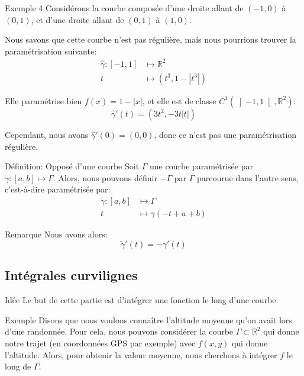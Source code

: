 \documentclass[a4paper]{article}
\begin{document}
\begin{parag}{Exemple 4}
    Considérons la courbe composée d'une droite allant de $\left(-1, 0\right)$ à $\left(0, 1\right)$, et d'une droite allant de $\left(0, 1\right)$ à $\left(1, 0\right)$. 

    Nous savons que cette courbe n'est pas régulière, mais nous pourrions trouver la paramétrisation suivante: 
    \[\begin{split}
        \hat{\gamma}: \left[-1, 1\right] &\longmapsto \mathbb{R}^2 \\
    t &\longmapsto \left(t^3, 1 - \left|t^3\right|\right)
    \end{split}\]
    
    Elle paramétrise bien $f\left(x\right) = 1 - \left|x\right|$, et elle est de classe $C^1\left(\left]-1, 1\right[ , \mathbb{R}^2\right)$: 
    \[\hat{\gamma}'\left(t\right) = \left(3t^2, -3t\left|t\right|\right)\]
    
    Cependant, nous avons $\hat{\gamma}'\left(0\right) = \left(0, 0\right)$, donc ce n'est pas une paramétrisation régulière.
\end{parag}

\begin{parag}{Définition: Opposé d'une courbe}
    Soit $\Gamma$ une courbe paramétrisée par $\gamma : \left[a, b\right] \mapsto \Gamma$. Alors, nous pouvons définir $-\Gamma$ par $\Gamma$ parcourue dans l'autre sens, c'est-à-dire paramétrisée par:
    \[\begin{split}
        \widetilde{\gamma}: \left[a, b\right] &\longmapsto \Gamma \\
    t &\longmapsto \gamma\left(-t + a + b\right)
    \end{split}\]

    \begin{subparag}{Remarque}
        Nous avons alors:
        \[\widetilde{\gamma}'\left(t\right) = -\gamma'\left(t\right)\]
    \end{subparag}
\end{parag}

\subsection{Intégrales curvilignes}
\begin{parag}{Idée}
    Le but de cette partie est d'intégrer une fonction le long d'une courbe.
\end{parag}

\begin{parag}{Exemple}
    Disons que nous voulons connaître l'altitude moyenne qu'on avait lors d'une randonnée. Pour cela, nous pouvons considérer la courbe $\Gamma \subset \mathbb{R}^2$ qui donne notre trajet (en coordonnées GPS par exemple) avec $f\left(x, y\right)$ qui donne l'altitude. Alors, pour obtenir la valeur moyenne, nous cherchons à intégrer $f$ le long de $\Gamma$.
\end{parag}
\end{document}
